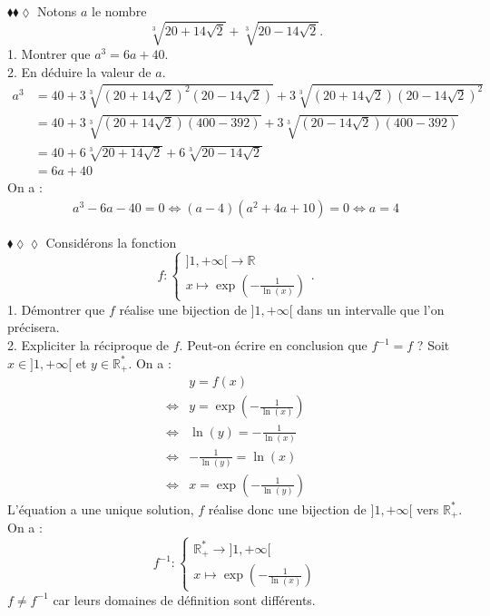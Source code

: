 \documentclass[11pt]{article}
\begin{document}
\begin{exercice}{$\blacklozenge\blacklozenge\lozenge$}{}
    Notons $a$ le nombre
    \begin{equation*}
        \sqrt[3]{20+14\sqrt{2}}+\sqrt[3]{20-14\sqrt{2}}.
    \end{equation*}
    1. Montrer que $a^3=6a+40$.\\
    2. En déduire la valeur de $a$.
    \tcblower
    \begin{align*}
        a^3&=40+3\sqrt[3]{(20+14\sqrt{2})^2(20-14\sqrt{2})}+3\sqrt[3]{(20+14\sqrt{2})(20-14\sqrt{2})^2}\\
        &=40+3\sqrt[3]{(20+14\sqrt{2})(400-392)}+3\sqrt[3]{(20-14\sqrt{2})(400-392)}\\
        &=40+6\sqrt[3]{20+14\sqrt{2}}+6\sqrt[3]{20-14\sqrt{2}}\\
        &=6a+40
    \end{align*}
     On a :
    \begin{align*}
        a^3-6a-40=0
        \iff(a-4)(a^2+4a+10)=0
        \iff a=4
    \end{align*}
\end{exercice}

\begin{exercice}{$\blacklozenge\lozenge\lozenge$}
    Considérons la fonction
    \begin{equation*}
        f:\begin{cases}\rbrack1,+\infty\lbrack\rightarrow\mathbb{R}\\x\mapsto\exp(-\frac{1}{\ln(x)})\end{cases}.
    \end{equation*}
    1. Démontrer que $f$ réalise une bijection de $\rbrack1,+\infty\lbrack$ dans un intervalle que l'on précisera.\\
    2. Expliciter la réciproque de $f$. Peut-on écrire en conclusion que $f^{-1}=f$ ?
    \tcblower
     Soit $x\in\rbrack1,+\infty\lbrack$ et $y\in\mathbb{R}^*_+$. On a :
    \begin{align*}
        &y=f(x)\\
        \iff& y=\exp(-\frac{1}{\ln(x)})\\
        \iff& \ln(y)=-\frac{1}{\ln(x)}\\
        \iff& -\frac{1}{\ln(y)}=\ln(x)\\
        \iff& x=\exp(-\frac{1}{\ln(y)})
    \end{align*}
    L'équation a une unique solution, $f$ réalise donc une bijection de $\rbrack1,+\infty\lbrack$ vers $\mathbb{R}^*_+$.\\
     On a :
    \begin{equation*}
        f^{-1}:\begin{cases}\mathbb{R}^*_+\rightarrow\rbrack1,+\infty\lbrack\\x\mapsto\exp(-\frac{1}{\ln(x)})\end{cases}
    \end{equation*}
    $f\neq f^{-1}$ car leurs domaines de définition sont différents.
\end{exercice}
\end{document}
